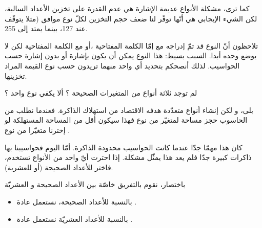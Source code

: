 كما ترى، مشكلة الأنواع عديمة الإشارة هي عدم القدرة على تخزين الأعداد السالبة، لكن الشيء الإيجابي هي أنّها توفّر لنا ضعف حجم التخزين لكلّ نوع موافق (مثلا
يتوقّف عند 127، بينما
يمتد إلى 255.

\begin{information}
  تلاحظون أنّ النوع
قد تمّ إدراجه مع إمّا الكلمة المفتاحية
،أو مع الكلمة المفتاحية
لكن لا يوضع وحده أبدا. السبب بسيط: هذا النوع يمكن أن يكون بإشارة أو بدون إشارة حسب الحواسيب. لذلك أنصحكم بتحديد أي واحد منهما تريدون حسب نوع القيمة المراد تخزينها.
\end{information}

\begin{question}
  لم توجد ثلاثة أنواع من المتغيرات الصحيحة ؟ ألا يكفي نوع واحد ؟
\end{question}

بلى، و لكن إنشاء أنواع متعدّدة هدفه الاقتصاد من استهلاك الذاكرة. فعندما نطلب من الحاسوب حجز مساحة لمتغيّر من نوع
فهذا سيكون أقل من المساحة المستهلكة لو إخترنا متغيّرا من نوع
.

كان هذا مهمّا جدّا عندما كانت الحواسيب محدودة الذاكرة. أمّا اليوم فحواسيبنا بها ذاكرات كبيرة جدّا فلم يعد هذا يمثّل مشكلة. إذا احترت أيّ واحد من الأنواع تستخدم، فاختر
للأعداد الصحيحة (أو
للعشرية).

باختصار، نقوم بالتفريق خاصّة بين الأعداد الصحيحة و العشريّة
\begin{itemize}
  \item بالنسبة للأعداد الصحيحة، نستعمل عادة
.
  \item بالنسبة للأعداد العشريّة نستعمل عادة
.
\end{itemize}
